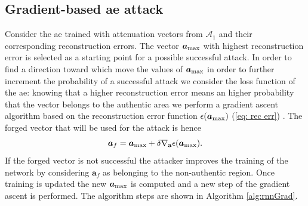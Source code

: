 \documentclass[draftcls,onecolumn,12pt]{IEEEtran}
\begin{document}
    





\subsection{Gradient-based \ac{ae} attack}
Consider the \ac{ae} trained with attenuation vectors from $\mathcal{A}_1$ and their corresponding reconstruction errors. The vector $\bm{a}_{\rm max}$ with highest reconstruction error is selected as a starting point for a possible successful attack. In order to find a direction toward which move the values of $\bm{a}_{\rm max}$ in order to further increment the probability of a successful attack we consider the loss function of the \ac{ae}: knowing that a higher reconstruction error means an higher probability that the vector belongs to the authentic area we perform a gradient ascent algorithm based on the reconstruction error function $\epsilon(\bm{a}_{\rm max})$ (\ref{eq: rec err}) . 
The forged vector that will be used for the attack is hence
\begin{equation}\label{eq: rnn attack}
    \bm{a}_f = \bm{a}_{\rm max}+ \delta \nabla_{\mathbf{a}}\epsilon(\bm{a}_{\rm max}).
\end{equation}
If the forged vector is not successful the attacker improves the training of the network by considering $\bm{a}_f$ as belonging to the non-authentic region. Once training is updated the new $\bm{a}_{\rm max}$ is computed and a new step of the gradient ascent is performed. The algorithm steps are shown in Algorithm \ref{alg:rnnGrad}.
\end{document}
